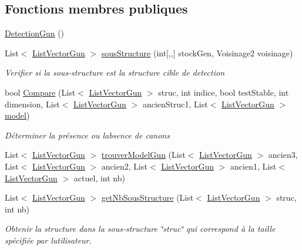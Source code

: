 \subsection*{Fonctions membres publiques}
\begin{DoxyCompactItemize}
\item 
\mbox{\hyperlink{class_detection_gun_a7fd1d6b8de83ef57d12bf0337833372b}{Detection\+Gun}} ()
\item 
List$<$ \mbox{\hyperlink{class_list_vector_gun}{List\+Vector\+Gun}} $>$ \mbox{\hyperlink{class_detection_gun_af804b47fcbcc2c89bbe17b47eb8f7c47}{sous\+Structure}} (int\mbox{[},,\mbox{]} stock\+Gen, Voisinage2 voisinage)
\begin{DoxyCompactList}\small\item\em Verifier si la sous-\/structure est la structure cible de detection \end{DoxyCompactList}\item 
bool \mbox{\hyperlink{class_detection_gun_a664491436b7ca39a34f4146754a6ae71}{Compare}} (List$<$ \mbox{\hyperlink{class_list_vector_gun}{List\+Vector\+Gun}} $>$ struc, int indice, bool test\+Stable, int dimension, List$<$ \mbox{\hyperlink{class_list_vector_gun}{List\+Vector\+Gun}} $>$ ancien\+Struc1, List$<$ \mbox{\hyperlink{class_list_vector_gun}{List\+Vector\+Gun}} $>$ \mbox{\hyperlink{class_detection_gun_a0c8ad0d86d7f0a02de8a120cffae1337}{model}})
\begin{DoxyCompactList}\small\item\em Déterminer la présence ou l\textquotesingle{}absence de canons \end{DoxyCompactList}\item 
List$<$ \mbox{\hyperlink{class_list_vector_gun}{List\+Vector\+Gun}} $>$ \mbox{\hyperlink{class_detection_gun_aaafe20e9ecbfe9e95e2f36ac49701d3d}{trouver\+Model\+Gun}} (List$<$ \mbox{\hyperlink{class_list_vector_gun}{List\+Vector\+Gun}} $>$ ancien3, List$<$ \mbox{\hyperlink{class_list_vector_gun}{List\+Vector\+Gun}} $>$ ancien2, List$<$ \mbox{\hyperlink{class_list_vector_gun}{List\+Vector\+Gun}} $>$ ancien1, List$<$ \mbox{\hyperlink{class_list_vector_gun}{List\+Vector\+Gun}} $>$ actuel, int nb)
\item 
List$<$ \mbox{\hyperlink{class_list_vector_gun}{List\+Vector\+Gun}} $>$ \mbox{\hyperlink{class_detection_gun_a0a14866d2727aea5d457121bd646f3bb}{get\+Nb\+Sous\+Structure}} (List$<$ \mbox{\hyperlink{class_list_vector_gun}{List\+Vector\+Gun}} $>$ struc, int nb)
\begin{DoxyCompactList}\small\item\em Obtenir la structure dans la sous-\/structure \char`\"{}struc\char`\"{} qui correspond à la taille spécifiée par l\textquotesingle{}utilisateur. \end{DoxyCompactList}\item 

\end{DoxyCompactItemize}
